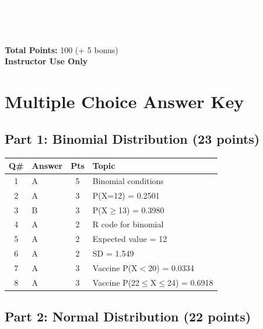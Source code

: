 \documentclass[11pt]{article}
\title{}
\author{}
\date{}
\begin{document}
\begin{tcolorbox}[colback=osaorange,colframe=black,boxrule=2pt,arc=0pt,left=3pt,right=3pt,top=6pt,bottom=6pt,boxsep=2pt]
\centering
\textcolor{white}{\textbf{\Large H524 Introduction to Biostatistics}}\\
\textcolor{white}{\textbf{\Large Week 3 Assignment - ANSWER KEY}}\\
\textcolor{white}{\textbf{\Large Fall 2025}}
\end{tcolorbox}

\vspace{8pt}

\noindent\textbf{Total Points:} 100 (+ 5 bonus)\\
\textbf{Instructor Use Only}

\section*{Multiple Choice Answer Key}

\subsection*{Part 1: Binomial Distribution (23 points)}

\begin{table}[h]
\begin{tabular}{clcp{8cm}}
\toprule
\textbf{Q\#} & \textbf{Answer} & \textbf{Pts} & \textbf{Topic} \\
\midrule
1 & \textcolor{correctgreen}{A} & 5 & Binomial conditions \\
2 & \textcolor{correctgreen}{A} & 3 & P(X=12) = 0.2501 \\
3 & \textcolor{correctgreen}{B} & 3 & P(X$\geq$13) = 0.3980 \\
4 & \textcolor{correctgreen}{A} & 2 & R code for binomial \\
5 & \textcolor{correctgreen}{A} & 2 & Expected value = 12 \\
6 & \textcolor{correctgreen}{A} & 2 & SD = 1.549 \\
7 & \textcolor{correctgreen}{A} & 3 & Vaccine P(X$<$20) = 0.0334 \\
8 & \textcolor{correctgreen}{A} & 3 & Vaccine P(22$\leq$X$\leq$24) = 0.6918 \\
\bottomrule
\end{tabular}
\end{table}

\subsection*{Part 2: Normal Distribution (22 points)}
\end{document}
